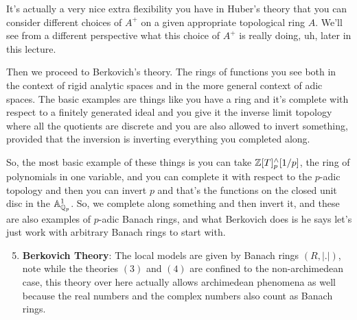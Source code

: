 It's actually a very nice extra flexibility you have in Huber's theory that you can consider different choices of $A^+$ on a given appropriate topological ring $A$. We'll see from a different perspective what this choice of $A^+$ is really doing, uh, later in this lecture.



 Then we proceed to Berkovich's theory. The rings of functions you see both in the context of rigid analytic spaces and in the more general context of adic spaces. The basic examples are things like you have a ring and it's complete with respect to a finitely generated ideal and you give it the inverse limit topology where all the quotients are discrete and you are also allowed to invert something, provided that the inversion is inverting everything you completed along.

 So, the most basic example of these things is you can take $\Bbb{Z}[T]^{\wedge}_{p}[1/p]$, the ring of polynomials in one variable, and you can complete it with respect to the $p$-adic topology and then you can invert $p$ and that's the functions on the closed unit disc in the $\mathbb{A}^1_{\Bbb{Q}_p}$. So, we complete along something and then invert it, and these are also examples of $p$-adic Banach rings, and what Berkovich does is he says let's just work with arbitrary Banach rings to start with.
 
\begin{enumerate}
    \setcounter{enumi}{4} 
    \item \textbf{Berkovich Theory}: The local models are given by Banach rings $(R, |.|)$, note while the theories $(3)$ and $(4)$ are confined to the non-archimedean case, this theory over here actually allows archimedean phenomena as well because the real numbers and the complex numbers also count as Banach rings.
\end{enumerate}

